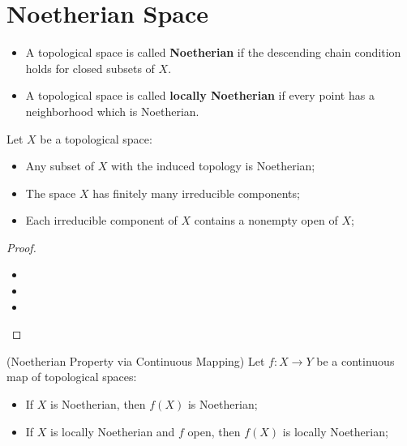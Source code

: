 \documentclass[Total.tex]{subfiles}
\begin{document}
		\section{Noetherian Space}
		
			\begin{Def}
				\begin{itemize}
					\item A topological space is called \textbf{Noetherian} if the descending chain condition holds for closed subsets of $X$. 
					
					\item A topological space is called \textbf{locally Noetherian} if every point has a neighborhood which is Noetherian.
				\end{itemize}
			\end{Def}
			
			\begin{lemma}
				Let $X$ be a topological space:
				
				\begin{itemize}
					\item Any subset of $X$ with the induced topology is Noetherian;
					\item The space $X$ has finitely many irreducible components;
					\item Each irreducible component of $X$ contains a nonempty open of $X$;
				\end{itemize}
			\end{lemma}
			
			\begin{proof}
				\begin{itemize}
					\item 
					\item 
					\item 
				\end{itemize}
			\end{proof}
			
			\begin{lemma}
				(Noetherian Property via Continuous Mapping) Let $f:X\rightarrow Y$ be a continuous map of topological spaces:
				
				\begin{itemize}
					\item If $X$ is Noetherian, then $f(X)$ is Noetherian;
					\item If $X$ is locally Noetherian and $f$ open, then $f(X)$ is locally Noetherian;
				\end{itemize}
			\end{lemma}
			
\end{document}
